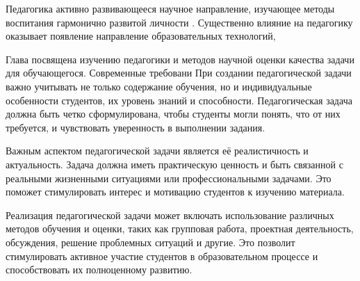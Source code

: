Педагогика активно развивающееся научное направление, изучающее методы воспитания гармонично развитой личности . 
Существенно влияние на педагогику оказывает появление направление образовательных технологий,

Глава посвящена изучению педагогики и методов научной оценки качества задачи для обучающегося. Современные требовани
При создании педагогической задачи важно учитывать не только содержание обучения, но и индивидуальные особенности студентов, их уровень знаний и способности. Педагогическая задача должна быть четко сформулирована, чтобы студенты могли понять, что от них требуется, и чувствовать уверенность в выполнении задания.

Важным аспектом педагогической задачи является её реалистичность и актуальность. Задача должна иметь практическую ценность и быть связанной с реальными жизненными ситуациями или профессиональными задачами. Это поможет стимулировать интерес и мотивацию студентов к изучению материала.



Реализация педагогической задачи может включать использование различных методов обучения и оценки, таких как групповая работа, проектная деятельность, обсуждения, решение проблемных ситуаций и другие. Это позволит стимулировать активное участие студентов в образовательном процессе и способствовать их полноценному развитию.

 